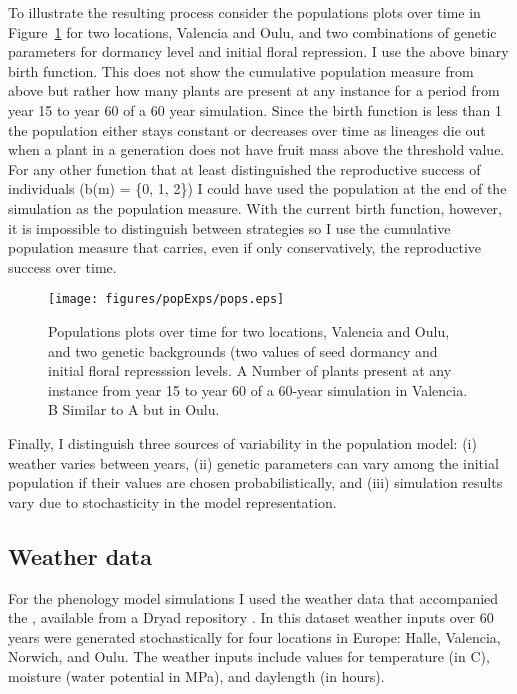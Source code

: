 To illustrate the resulting process consider the populations plots over time in
Figure~\ref{fig:pops} for two locations, Valencia and Oulu, and two combinations of
genetic parameters for dormancy level and initial floral repression. I use the
above binary birth function. This does not show the cumulative population measure from
above but rather how many plants are present at any instance for a period from
year 15 to year 60 of a 60 year simulation. Since the birth function is less
than 1 the population either stays constant or decreases over time as lineages die
out when a plant in a generation does not have fruit mass above the threshold
value. For any other function that at least distinguished the reproductive
success of individuals (\eg b(m) = \{0, 1, 2\}) I could have used the population
at the end of the simulation as the population measure. With the current birth
function, however, it is impossible to distinguish between strategies so I use
the cumulative population measure that carries, even if only conservatively, the
reproductive success over time.

\begin{figure}[tb]
  \centering
  \texttt{[image: figures/popExps/pops.eps]}
  \caption{Populations plots over time for two locations, Valencia and Oulu, and
    two genetic backgrounds (two values of seed dormancy and initial floral
    represssion levels. A Number of plants present at any instance from year 15
    to year 60 of a 60-year simulation in Valencia. B Similar to A but in Oulu.}
  \label{fig:pops}
\end{figure}

Finally, I distinguish three sources of variability in the population model: (i)
weather varies between years, (ii) genetic parameters can vary among the initial
population if their values are chosen probabilistically, and (iii) simulation
results vary due to stochasticity in the model representation.

\subsection{Weather data}
\label{weather-data}
For the phenology model simulations I used the weather data that accompanied the
\citet{burghardt_modeling_2015}, available from a Dryad repository
\citep{burghardt_data_2014}. In this dataset weather inputs over 60 years were
generated stochastically for four locations in Europe: Halle, Valencia, Norwich,
and Oulu. The weather inputs include values for temperature (in \textdegree C),
moisture (water potential in MPa), and daylength (in hours).

